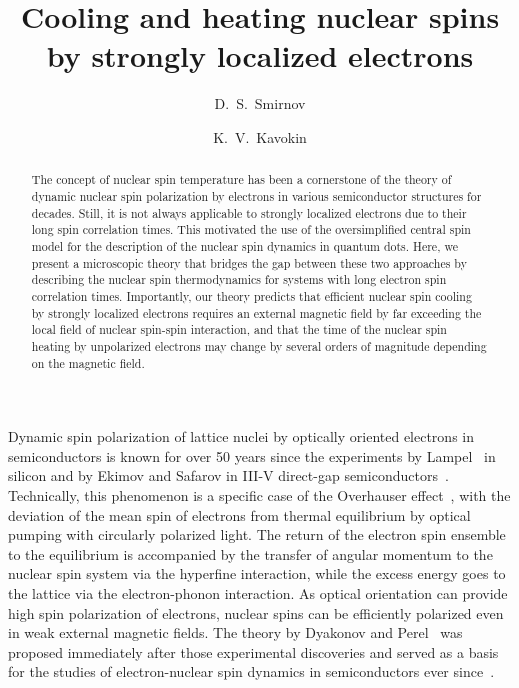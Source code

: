 \documentclass[prl,nobibnotes,twocolumn,aps,longbibliography,superscriptaddress,notoc]{revtex4-1}
\begin{document}
\title{Cooling and heating nuclear spins by strongly localized electrons}

\author{D.~S.~Smirnov}
\author{K.~V.~Kavokin}

\begin{abstract}
  The concept of nuclear spin temperature has been a cornerstone of the theory of dynamic nuclear spin polarization by electrons in various semiconductor structures for decades. Still, it is not always applicable to strongly localized electrons due to their long spin correlation times. This motivated the use of the oversimplified central spin model for the description of the nuclear spin dynamics in quantum dots. Here, we present a microscopic theory that bridges the gap between these two approaches by describing the nuclear spin thermodynamics for systems with long electron spin correlation times. Importantly, our theory predicts that efficient nuclear spin cooling by strongly localized electrons requires an external magnetic field by far exceeding the local field of nuclear spin-spin interaction, and that the time of the nuclear spin heating by unpolarized electrons may change by several orders of magnitude depending on the magnetic field.
\end{abstract}

\maketitle{}

Dynamic spin polarization of lattice nuclei by optically oriented electrons in semiconductors is known for over 50 years since the experiments by Lampel~\cite{lampel68} in silicon and by Ekimov and Safarov in III-V direct-gap semiconductors~\cite{PismaZhETF.15.257}. Technically, this phenomenon is a specific case of the Overhauser effect~\cite{PhysRev.92.411}, with the deviation of the mean spin of electrons from thermal equilibrium by optical pumping with circularly polarized light. The return of the electron spin ensemble to the equilibrium is accompanied by the transfer of angular momentum to the nuclear spin system via the hyperfine interaction, while the excess energy goes to the lattice via the electron-phonon interaction. As optical orientation can provide high spin polarization of electrons, nuclear spins can be efficiently polarized even in weak external magnetic fields. The theory by Dyakonov and Perel~\cite{dp74} was proposed immediately after those experimental discoveries and served as a basis for the studies of electron-nuclear spin dynamics in semiconductors ever since~\cite{book_Glazov}.
\end{document}
